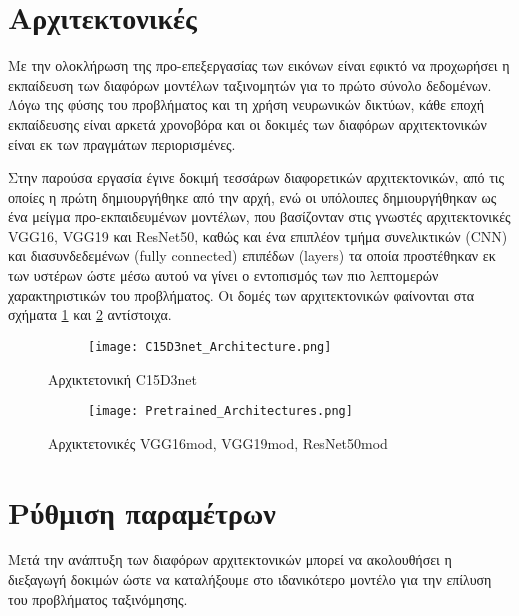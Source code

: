 \vspace{-2em}
\section{Αρχιτεκτονικές}
\label{ArchitecturesUsed}

Με την ολοκλήρωση της προ-επεξεργασίας των εικόνων είναι εφικτό να προχωρήσει  η εκπαίδευση των διαφόρων μοντέλων ταξινομητών για το πρώτο σύνολο δεδομένων. Λόγω της φύσης του προβλήματος και τη χρήση νευρωνικών δικτύων, κάθε εποχή εκπαίδευσης είναι αρκετά χρονοβόρα και οι δοκιμές των διαφόρων αρχιτεκτονικών είναι εκ των πραγμάτων περιορισμένες. 

Στην παρούσα εργασία έγινε δοκιμή τεσσάρων διαφορετικών αρχιτεκτονικών, από τις οποίες η πρώτη δημιουργήθηκε από την αρχή, ενώ οι υπόλοιπες δημιουργήθηκαν ως ένα μείγμα προ-εκπαιδευμένων μοντέλων, που βασίζονταν στις γνωστές αρχιτεκτονικές VGG16, VGG19 και ResNet50, καθώς και ένα επιπλέον τμήμα συνελικτικών (CNN) και διασυνδεδεμένων (fully connected) επιπέδων (layers) τα οποία προστέθηκαν εκ των υστέρων ώστε μέσω αυτού να γίνει ο εντοπισμός των πιο λεπτομερών χαρακτηριστικών του προβλήματος. Οι δομές των αρχιτεκτονικών φαίνονται στα σχήματα \ref{C15D3net_Architecture_fig} και \ref{Pretrained_Architectures_fig} αντίστοιχα. 


\begin{figure}[H]
\centering
\begin{subfigure}[t]{0.9\textwidth}%
\texttt{[image: C15D3net\_Architecture.png]}
\end{subfigure}
\caption{Αρχικτετονική C15D3net}
\label{C15D3net_Architecture_fig}
\end{figure}

\begin{figure}[H]
\centering
\begin{subfigure}[t]{0.9\textwidth}%
\texttt{[image: Pretrained\_Architectures.png]}
\end{subfigure}
\caption{Αρχικτετονικές VGG16mod, VGG19mod, ResNet50mod}
\label{Pretrained_Architectures_fig}
\end{figure}


\section{Ρύθμιση παραμέτρων}
\label{Parameters tuning}

Μετά την ανάπτυξη των διαφόρων αρχιτεκτονικών μπορεί να ακολουθήσει η διεξαγωγή δοκιμών ώστε να καταλήξουμε στο ιδανικότερο μοντέλο για την επίλυση του προβλήματος ταξινόμησης. 

